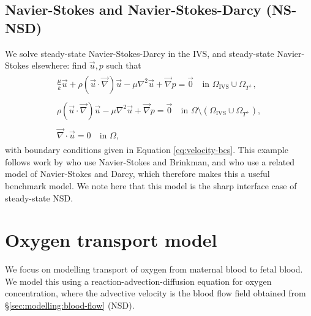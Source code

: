         \subsection{Navier-Stokes and Navier-Stokes-Darcy (NS-NSD)} \label{sec:modelling:blood-flow:ns+nsb}
            We solve steady-state Navier-Stokes-Darcy in the IVS, and steady-state Navier-Stokes elsewhere: find $\vec{u}, p$ such that
            \begin{subequations}
                \begin{align}
                    \begin{split}
                        \frac{\mu}{k}\vec{u} + \rho (\vec{u} \cdot \vec{\nabla}) \vec{u} - \mu \nabla^2 \vec{u} + \vec{\nabla} p = \vec{0} &~ \text{in } \Omega_{\text{IVS}} \cup \Omega_{T^+},
                    \end{split}\\
                    \begin{split}
                        \rho (\vec{u} \cdot \vec{\nabla}) \vec{u} - \mu \nabla^2 \vec{u} + \vec{\nabla} p = \vec{0} &~ \text{in } \Omega \setminus (\Omega_{\text{IVS}} \cup \Omega_{T^+}),
                    \end{split}\\
                    \begin{split}
                        \vec{\nabla} \cdot \vec{u} = 0 &~ \text{in } \Omega,
                    \end{split}%
                \end{align}%
                \label{eq:ns-nsb}%
            \end{subequations}%
            with boundary conditions given in Equation \ref{eq:velocity-bcs}. This example follows work by \citeauthor{lecarpentierComputationalFluidDynamic2016} \cite{lecarpentierComputationalFluidDynamic2016} who use Navier-Stokes and Brinkman, and \citeauthor{saghianAssociationPlacentalJets2017} \cite{saghianAssociationPlacentalJets2017} who use a related model of Navier-Stokes and Darcy, which therefore makes this a useful benchmark model. We note here that this model is the sharp interface case of steady-state NSD.

    \section{Oxygen transport model} \label{sec:modelling:transport}
        We focus on modelling transport of oxygen from maternal blood to fetal blood. We model this using a reaction-advection-diffusion equation for oxygen concentration, where the advective velocity is the blood flow field obtained from \S\ref{sec:modelling:blood-flow} (NSD).
        
